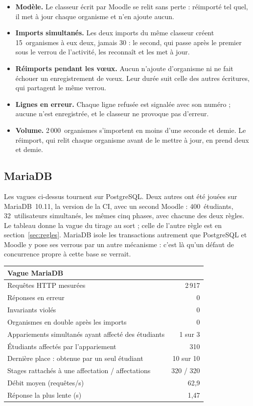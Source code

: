 \documentclass[11pt,a4paper]{article}
\begin{document}
\begin{itemize}
  \item \textbf{Modèle.} Le classeur écrit par Moodle se relit sans perte : réimporté tel quel,
    il met à jour chaque organisme et n'en ajoute aucun.
  \item \textbf{Imports simultanés.} Les deux imports du même classeur créent 15~organismes à eux
    deux, jamais 30 : le second, qui passe après le premier sous le verrou de l'activité, les
    reconnaît et les met à jour.
  \item \textbf{Réimports pendant les vœux.} Aucun n'ajoute d'organisme ni ne fait échouer un
    enregistrement de vœux. Leur durée suit celle des autres écritures, qui partagent le même
    verrou.
  \item \textbf{Lignes en erreur.} Chaque ligne refusée est signalée avec son numéro ; aucune
    n'est enregistrée, et le classeur ne provoque pas d'erreur.
  \item \textbf{Volume.} 2\,000~organismes s'importent en moins d'une seconde et demie. Le
    réimport, qui relit chaque organisme avant de le mettre à jour, en prend deux et demie.
\end{itemize}

\subsection{MariaDB}\label{sec:mariadb}

Les vagues ci-dessus tournent sur PostgreSQL. Deux autres ont été jouées sur MariaDB~10.11, la
version de la CI, avec un second Moodle : 400~étudiants, 32~utilisateurs simultanés, les mêmes cinq
phases, avec chacune des deux règles. Le tableau donne la vague du tirage au sort ; celle de l'autre
règle est en section~\ref{sec:regles}. MariaDB isole les transactions autrement que PostgreSQL et Moodle y pose ses verrous par un
autre mécanisme : c'est là qu'un défaut de concurrence propre à cette base se verrait.

\begin{center}
\begin{tabularx}{0.8\linewidth}{@{}X r@{}}
\toprule
\textbf{Vague MariaDB} & \\
\midrule
Requêtes HTTP mesurées & 2\,917 \\
Réponses en erreur & 0 \\
Invariants violés & 0 \\
Organismes en double après les imports & 0 \\
Appariements simultanés ayant affecté des étudiants & 1 sur 3 \\
Étudiants affectés par l'appariement & 310 \\
Dernière place : obtenue par un seul étudiant & 10 sur 10 \\
Stages rattachés à une affectation / affectations & 320 / 320 \\
Débit moyen (requêtes/s) & 62{,}9 \\
Réponse la plus lente (s) & 1{,}47 \\
\bottomrule
\end{tabularx}
\end{center}
\end{document}
